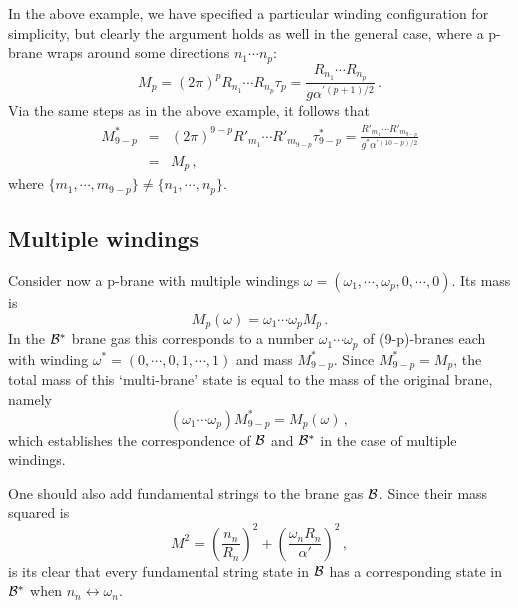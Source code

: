 \documentclass[a4paper,twocolumn,nofootinbib,tightenlines,prd,aps,
               superscriptaddress]{revtex4} %
\newcommand{\al}{\alpha}
\newcommand{\om}{\omega}
\newcommand{\cB}{{\cal{B}}}
\begin{document}
In the above example, we have specified a particular winding
configuration for simplicity, but clearly the argument holds as
well in the general case, where a p-brane wraps around some
directions $n_1 \cdots n_p$:
\begin{equation}
    M_{p}=(2\pi)^p R_{n_1} \cdots R_{n_p} \tau_p = \frac{R_{n_1}
    \cdots R_{n_p}}{g \al^{'(p+1)/2}} \, .
\end{equation}
Via the same steps as in the above example, it follows that
\begin{eqnarray}
    M^*_{9-p} &=& (2\pi)^{9-p} R'_{m_1} \cdots R'_{m_{9-p}} \tau^*_{9-p}
    = \frac{R'_{m_1} \cdots R'_{m_{9-p}}}{g^* \al^{'(10-p)/2}} \nonumber \\
              &=& M_p \, ,
\end{eqnarray}
where $\{m_1, \cdots, m_{9-p}\} \neq \{n_1, \cdots, n_{p}\}$.



\subsection{Multiple windings}

Consider now a p-brane with multiple windings
$\om=(\om_1,\cdots,\om_p,0,\cdots,0)$. Its mass is
\begin{equation}
    M_p(\om) = \om_1 \cdots \om_p M_p\,.
\end{equation}
In the $\cB^*$ brane gas this corresponds to a number $\om_1
\cdots \om_p$ of (9-p)-branes each with winding
$\om^*=(0,\cdots,0,1,\cdots,1)$ and mass $M^*_{9-p}$. Since
$M^*_{9-p}=M_p$, the total mass of this `multi-brane' state is
equal to the mass of the original brane, namely
\begin{equation}
     (\om_1 \cdots \om_p) M^*_{9-p}=M_p(\om) \,,
\end{equation}
which establishes the correspondence of $\cB$ and $\cB^*$ in the
case of multiple windings.

One should also add fundamental strings to the brane gas $\cB$.
Since their mass squared is
\begin{equation}
    M^2=\left(\frac{n_n}{R_n}\right)^2+\left(\frac{\om_n
    R_n}{\al'}\right)^2\,,
\end{equation}
is its clear that every fundamental string state in $\cB$ has a
corresponding state in $\cB^*$ when $n_n \leftrightarrow \om_n$.


\end{document}

